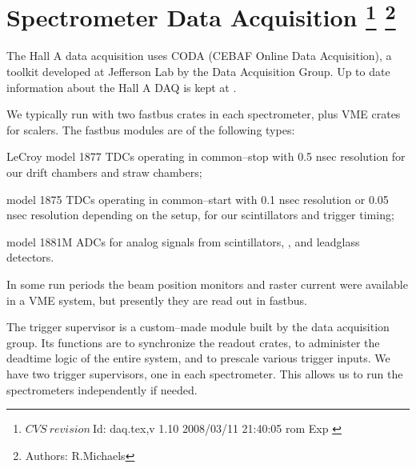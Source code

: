 \chapter[Spectrometer Data Acquisition]{Spectrometer Data Acquisition
\footnote{
  $CVS~revision~ $Id: daq.tex,v 1.10 2008/03/11 21:40:05 rom Exp $ $
}
\footnote{Authors: R.Michaels }
}





\par
The Hall A data acquisition uses CODA\cite{CODAwww}
(CEBAF Online Data Acquisition), a toolkit
developed at Jefferson Lab by the Data
Acquisition Group. 
Up to date information about the Hall A DAQ
is kept at 
.

\par
We typically run with two fastbus crates in
each spectrometer, plus VME crates for scalers.
The fastbus modules are of the following
types:
\begin{list}{.~}{\setlength{\itemsep}{-0.15cm}}
  \item LeCroy model
    1877 TDCs operating in common--stop with 0.5 nsec
    resolution for our drift chambers and
    straw chambers; 
  \item model 1875 TDCs operating in common--start with 0.1 nsec resolution
      or 0.05 nsec resolution depending on the setup,
      for our scintillators and trigger timing;
  \item model 1881M ADCs for analog signals from scintillators, 
        \Cherenkov{}, and leadglass detectors.
\end{list}
In some run periods the beam position monitors
and raster current were available in a VME system,
but presently they are read out in fastbus.

\par
The trigger supervisor is a custom--made
module built by the data
acquisition group.  Its functions are to
synchronize the readout crates, to administer
the deadtime logic of the entire system, and
to prescale various trigger inputs.  
We have two trigger supervisors,
one in each spectrometer.  This allows us to
run the spectrometers independently if needed.

